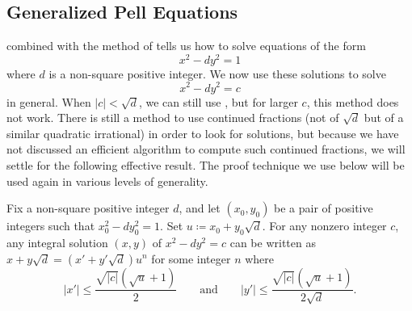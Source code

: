 \documentclass[../notes.tex]{subfiles}
\begin{document}
\subsection{Generalized Pell Equations}
 combined with the method of  tells us how to solve equations of the form
\[x^2-dy^2=1\]
where $d$ is a non-square positive integer. We now use these solutions to solve
\[x^2-dy^2=c\]
in general. When $\left|c\right|<\sqrt d$, we can still use , but for larger $c$, this method does not work. There is still a method to use continued fractions (not of $\sqrt d$ but of a similar quadratic irrational) in order to look for solutions, but because we have not discussed an efficient algorithm to compute such continued fractions, we will settle for the following effective result. The proof technique we use below will be used again in various levels of generality.
\begin{proposition} \label{prop:general-pell}
	Fix a non-square positive integer $d$, and let $(x_0,y_0)$ be a pair of positive integers such that $x_0^2-dy_0^2=1$. Set $u\coloneqq x_0+y_0\sqrt d$. For any nonzero integer $c$, any integral solution $(x,y)$ of $x^2-dy^2=c$ can be written as $x+y\sqrt d=(x'+y'\sqrt d)u^n$ for some integer $n$ where
	\[\left|x'\right|\le\frac{\sqrt{\left|c\right|}\left(\sqrt u+1\right)}2\qquad\text{and}\qquad\left|y'\right|\le\frac{\sqrt{\left|c\right|}\left(\sqrt u+1\right)}{2\sqrt d}.\]
\end{proposition}
\end{document}
